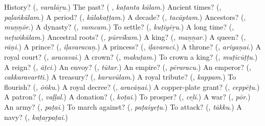 \begin{tcolorbox}[breakable,colback=teal!4,colframe=teal!35!black,title={Before you move on}]
History? (\textbf{}, \emph{varalāṟu}.) The past? (\textbf{ }, \emph{kaṭanta kālam}.) Ancient times? (\textbf{}, \emph{paḻaṅkālam}.) A period? (\textbf{}, \emph{kālakaṭṭam}.) A decade? (\textbf{}, \emph{tacāptam}.) Ancestors? (\textbf{}, \emph{muṉṉōr}.) A dynasty? (\textbf{}, \emph{vamcam}.) To settle? (\textbf{}, \emph{kuṭiyēṟu}.) A long time? (\textbf{}, \emph{neṭuṅkālam}.) Ancestral roots? (\textbf{}, \emph{pūrvīkam}.) A king? (\textbf{}, \emph{maṉṉar}.) A queen? (\textbf{}, \emph{rāṇi}.) A prince? (\textbf{}, \emph{iḷavaracaṉ}.) A princess? (\textbf{}, \emph{iḷavaraci}.) A throne? (\textbf{}, \emph{ariyaṇai}.) A royal court? (\textbf{}, \emph{aracavai}.) A crown? (\textbf{}, \emph{makuṭam}.) To crown a king? (\textbf{}, \emph{muṭicūṭṭu}.) A reign? (\textbf{}, \emph{āṭci}.) An envoy? (\textbf{}, \emph{tūtar}.) An empire? (\textbf{}, \emph{pēraracu}.) An emperor? (\textbf{}, \emph{cakkaravartti}.) A treasury? (\textbf{}, \emph{karuvūlam}.) A royal tribute? (\textbf{}, \emph{kappam}.) To flourish? (\textbf{}, \emph{ōṅku}.) A royal decree? (\textbf{}, \emph{aracāṇai}.) A copper-plate grant? (\textbf{}, \emph{ceppēṭu}.) A patron? (\textbf{}, \emph{vaḷḷal}.) A donation? (\textbf{}, \emph{koṭai}.) To prosper? (\textbf{}, \emph{ceḻi}.) A war? (\textbf{}, \emph{pōr}.) An army? (\textbf{}, \emph{paṭai}.) To march against? (\textbf{}, \emph{paṭaiyeṭu}.) To attack? (\textbf{}, \emph{tākku}.) A navy? (\textbf{}, \emph{kaṭaṟpaṭai}.)
\end{tcolorbox}
